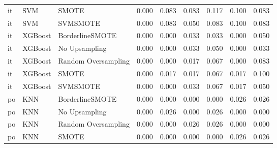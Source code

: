 \begin{tabular}{lllllllll}
      it &                          SVM &               SMOTE & 0.000 &                     0.083 &                 0.083 &                  0.117 &                                   0.100 &     0.083 \\
      it &                          SVM &            SVMSMOTE & 0.000 &                     0.083 &                 0.050 &                  0.083 &                                   0.100 &     0.083 \\
      it &                      XGBoost &     BorderlineSMOTE & 0.000 &                     0.000 &                 0.033 &                  0.033 &                                   0.000 &     0.050 \\
      it &                      XGBoost &       No Upsampling & 0.000 &                     0.000 &                 0.033 &                  0.050 &                                   0.000 &     0.033 \\
      it &                      XGBoost & Random Oversampling & 0.000 &                     0.000 &                 0.017 &                  0.067 &                                   0.000 &     0.083 \\
      it &                      XGBoost &               SMOTE & 0.000 &                     0.017 &                 0.017 &                  0.067 &                                   0.017 &     0.100 \\
      it &                      XGBoost &            SVMSMOTE & 0.000 &                     0.000 &                 0.033 &                  0.067 &                                   0.017 &     0.050 \\
      po &                          KNN &     BorderlineSMOTE & 0.000 &                     0.000 &                 0.000 &                  0.000 &                                   0.026 &     0.026 \\
      po &                          KNN &       No Upsampling & 0.000 &                     0.026 &                 0.000 &                  0.026 &                                   0.000 &     0.000 \\
      po &                          KNN & Random Oversampling & 0.000 &                     0.000 &                 0.026 &                  0.026 &                                   0.000 &     0.000 \\
      po &                          KNN &               SMOTE & 0.000 &                     0.000 &                 0.000 &                  0.000 &                                   0.026 &     0.026 \\

\end{tabular}

